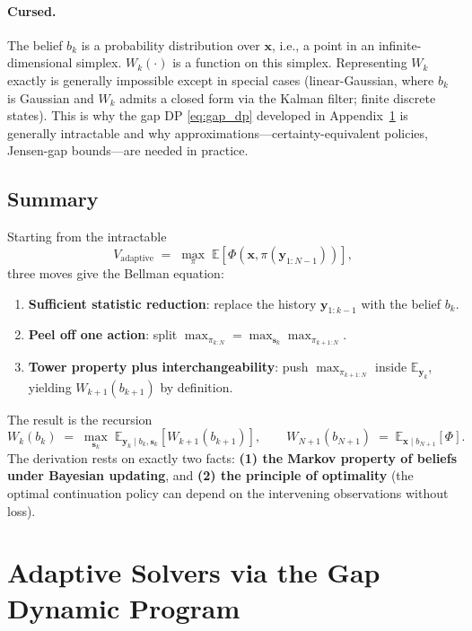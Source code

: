 \documentclass[11pt,a4paper]{article}
\newcommand{\E}{\mathbb{E}}
\begin{document}
\paragraph{Cursed.}  The belief $b_k$ is a probability distribution over $\bm{x}$, i.e., a point in an infinite-dimensional simplex.  $W_k(\cdot)$ is a function on this simplex.  Representing $W_k$ exactly is generally impossible except in special cases (linear-Gaussian, where $b_k$ is Gaussian and $W_k$ admits a closed form via the Kalman filter; finite discrete states).  This is why the gap DP \eqref{eq:gap_dp} developed in Appendix~\ref{app:gap_dp} is generally intractable and why approximations---certainty-equivalent policies, Jensen-gap bounds---are needed in practice.

\subsection{Summary}

Starting from the intractable
\begin{equation}
  V_{\text{adaptive}} \;=\; \max_\pi \; \E\!\left[\Phi(\bm{x}, \pi(\bm{y}_{1:N-1}))\right],
\end{equation}
three moves give the Bellman equation:
\begin{enumerate}[nosep,label=(\alph*)]
  \item \textbf{Sufficient statistic reduction}: replace the history $\bm{y}_{1:k-1}$ with the belief $b_k$.
  \item \textbf{Peel off one action}: split $\max_{\pi_{k:N}} = \max_{\bm{s}_k} \max_{\pi_{k+1:N}}$.
  \item \textbf{Tower property plus interchangeability}: push $\max_{\pi_{k+1:N}}$ inside $\E_{\bm{y}_k}$, yielding $W_{k+1}(b_{k+1})$ by definition.
\end{enumerate}
The result is the recursion
\begin{equation}
  W_k(b_k) \;=\; \max_{\bm{s}_k}\; \E_{\bm{y}_k \mid b_k, \bm{s}_k}\!\left[W_{k+1}(b_{k+1})\right], \qquad W_{N+1}(b_{N+1}) \;=\; \E_{\bm{x} \mid b_{N+1}}\!\left[\Phi\right].
\end{equation}
The derivation rests on exactly two facts: \textbf{(1) the Markov property of beliefs under Bayesian updating}, and \textbf{(2) the principle of optimality} (the optimal continuation policy can depend on the intervening observations without loss).

\section{Adaptive Solvers via the Gap Dynamic Program}
\label{app:gap_dp}
\end{document}
